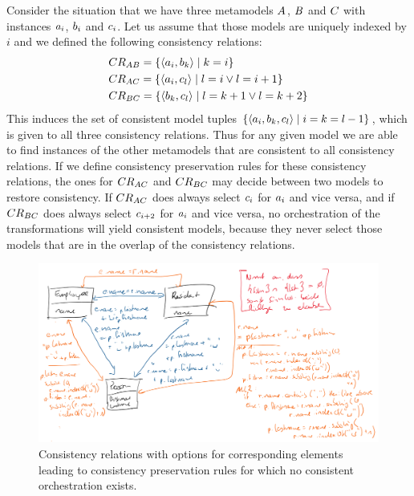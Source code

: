 Consider the situation that we have three metamodels $A_{}$, $B_{}$ and $C_{}$ with instances $a_{i}$, $b_{i}$ and $c_{i}$.
Let us assume that those models are uniquely indexed by $i$ and we defined the following consistency relations:
\begin{align*}
    &
    CR_{AB} = \{ \langle a_{i}, b_{k} \rangle \mid k = i \} \\
    &
    CR_{AC} = \{ \langle a_{i}, c_{l} \rangle \mid l = i \lor l = i+1 \} \\
    &
    CR_{BC} = \{ \langle b_{k}, c_{l} \rangle \mid l = k+1 \lor l = k+2 \}
\end{align*}
This induces the set of consistent model tuples $\{ \langle a_{i}, b_{k}, c_{l} \rangle \mid  i = k = l-1 \}$, which is given to all three consistency relations.
Thus for any given model we are able to find instances of the other metamodels that are consistent to all consistency relations.
If we define consistency preservation rules for these consistency relations, the ones for $CR_{AC}$ and $CR_{BC}$ may decide between two models to restore consistency.
If $CR_{AC}$ does always select $c_{i}$ for $a_{i}$ and vice versa, and if $CR_{BC}$ does always select $c_{i+2}$ for $a_{i}$ and vice versa, no orchestration of the transformations will yield consistent models, because they never select those models that are in the overlap of the consistency relations.

\begin{figure}
    \centering
    \includegraphics[width=\textwidth]{figures/correctness/orchestration/no_orchestration.png}
    \caption[Consistency preservation rules without orchestration]{Consistency relations with options for corresponding elements leading to consistency preservation rules for which no consistent orchestration exists.}
    \label{fig:orchestration:no_orchestration}
\end{figure}

